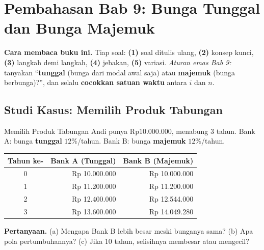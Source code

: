 
\renewcommand{\babjudul}{Pembahasan Latihan — Bab 9}


\setcounter{chapter}{9}

\chapter*{Pembahasan Bab 9: Bunga Tunggal dan Bunga Majemuk}

\begin{tips}
\textbf{Cara membaca buku ini.} Tiap soal: \textbf{(1)} soal ditulis ulang,
\textbf{(2)} konsep kunci, \textbf{(3)} langkah demi langkah, \textbf{(4)}
jebakan, \textbf{(5)} variasi. \emph{Aturan emas Bab 9:} tanyakan
``\textbf{tunggal} (bunga dari modal awal saja) atau \textbf{majemuk} (bunga
berbunga)?'', dan selalu \textbf{cocokkan satuan waktu} antara $i$ dan $n$.
\end{tips}

\section*{Studi Kasus: Memilih Produk Tabungan}

\begin{studikasus}{Memilih Produk Tabungan}
Andi punya Rp$10.000.000$, menabung $3$ tahun. Bank A: bunga \textbf{tunggal}
$12\%$/tahun. Bank B: bunga \textbf{majemuk} $12\%$/tahun.
\begin{center}
\begin{tabular}{c|r|r}
\toprule
Tahun ke- & Bank A (Tunggal) & Bank B (Majemuk) \\ \midrule
0 & Rp 10.000.000 & Rp 10.000.000 \\
1 & Rp 11.200.000 & Rp 11.200.000 \\
2 & Rp 12.400.000 & Rp 12.544.000 \\
3 & Rp 13.600.000 & Rp 14.049.280 \\ \bottomrule
\end{tabular}
\end{center}
\textbf{Pertanyaan.} (a) Mengapa Bank B lebih besar meski bunganya sama?
(b) Apa pola pertumbuhannya? (c) Jika $10$ tahun, selisihnya membesar atau
mengecil?
\end{studikasus}

